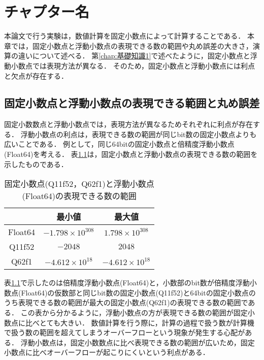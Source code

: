 \chapter {チャプター名}
\label{chap:提案手法}
\begin{comment}
    ストーリー：
    固定小数点演算は浮動小数点演算よりも計算時間が速いとされている．
    しかし，浮動小数点に比べて精度が低くなる恐れがある．
    本論文では，固定小数点と浮動小数点での数値計算の結果を比べ，固定小数点での演算も浮動小数点と同程度の精度で計算できることを示した．
    実験結果より固定小数点演算で浮動小数点より高速で，浮動小数点と同程度の計算を実現できるのではないかと考える．
\end{comment}
本論文で行う実験は，数値計算を固定小数点によって計算することである．
本章では，固定小数点と浮動小数点の表現できる数の範囲や丸め誤差の大きさ，演算の違いについて述べる．
第\ref{chap:基礎知識1}で述べたように，固定小数点と浮動小数点では表現方法が異なる．
そのため，固定小数点と浮動小数点には利点と欠点が存在する．

\section{固定小数点と浮動小数点の表現できる範囲と丸め誤差}
固定小数数点と浮動小数点では，表現方法が異なるためそれぞれに利点が存在する．
浮動小数点の利点は，表現できる数の範囲が同じbit数の固定小数点よりも広いことである．
例として，同じ64bitの固定小数点と倍精度浮動小数点(Float64)を考える．
表\ref{tab:fixed_float_range}は，固定小数点と浮動小数点の表現できる数の範囲を示したものである．

\begin{table}[H]
    \centering
    \caption{固定小数点(Q11f52，Q62f1)と浮動小数点(Float64)の表現できる数の範囲}
    \begin{tabular}{c|c|c}
         & 最小値 & 最大値　\\ \hline\hline
          Float64 & $-1.798 \times 10^{308}$ & $1.798 \times 10^{308}$ \\
          Q11f52 & $-2048$ & $2048$ \\
          Q62f1 & $-4.612 \times 10^{18}$ & $-4.612 \times 10^{18}$
    \end{tabular}
    \label{tab:fixed_float_range}
\end{table}

表\ref{tab:fixed_float_range}で示したのは倍精度浮動小数点(Float64)と，小数部のbit数が倍精度浮動小数点(Float64)の仮数部と同じbit数の固定小数点(Q11f52)と64bitの固定小数点のうち表現できる数の範囲が最大の固定小数点(Q62f1)の表現できる数の範囲である．
この表から分かるように，浮動小数点の方が表現できる数の範囲が固定小数点に比べとても大きい．
数値計算を行う際に，計算の過程で扱う数が計算機で扱う数の範囲を超えてしまうオーバーフローという現象が発生する心配がある．
浮動小数点は，固定小数数点に比べ表現できる数の範囲が広いため，固定小数点に比べオーバーフローが起こりにくいという利点がある．

